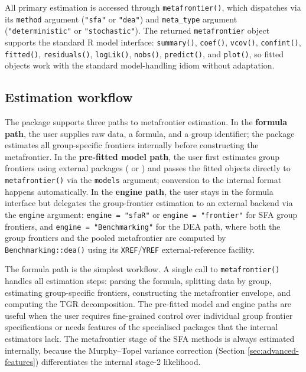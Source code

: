 All primary estimation is accessed through \texttt{metafrontier()}, which dispatches
via its \texttt{method} argument (\texttt{"sfa"} or \texttt{"dea"}) and \texttt{meta\_type} argument
(\texttt{"deterministic"} or \texttt{"stochastic"}). The returned \texttt{metafrontier} object
supports the standard \textsf{R} model interface: \texttt{summary()}, \texttt{coef()},
\texttt{vcov()}, \texttt{confint()}, \texttt{fitted()}, \texttt{residuals()}, \texttt{logLik()}, \texttt{nobs()},
\texttt{predict()}, and \texttt{plot()}, so fitted objects work with the standard
model-handling idiom without adaptation.

\subsection{Estimation workflow}\label{sec:estimation-workflow}

The package supports three paths to metafrontier estimation. In the
\textbf{formula path}, the user supplies raw data, a formula, and a group
identifier; the package estimates all group-specific frontiers internally
before constructing the metafrontier. In the \textbf{pre-fitted model path}, the
user first estimates group frontiers using external packages (
or ) and passes the fitted objects directly to
\texttt{metafrontier()} via the \texttt{models} argument; conversion to the internal
format happens automatically. In the \textbf{engine path}, the user stays in the
formula interface but delegates the group-frontier estimation to an
external backend via the \texttt{engine} argument: \texttt{engine\ =\ "sfaR"} or
\texttt{engine\ =\ "frontier"} for SFA group frontiers, and
\texttt{engine\ =\ "Benchmarking"} for the DEA path, where both the group frontiers
and the pooled metafrontier are computed by \texttt{Benchmarking::dea()} using its
\texttt{XREF}/\texttt{YREF} external-reference facility.

The formula path is the simplest workflow. A single call to \texttt{metafrontier()}
handles all estimation steps: parsing the formula, splitting data by group,
estimating group-specific frontiers, constructing the metafrontier envelope,
and computing the TGR decomposition. The pre-fitted model and engine paths
are useful when the user requires fine-grained control over individual group
frontier specifications or needs features of the specialised packages
that the internal estimators lack. The metafrontier stage of the SFA methods is always
estimated internally, because the Murphy--Topel variance correction
(Section \ref{sec:advanced-features}) differentiates the internal stage-2 likelihood.

